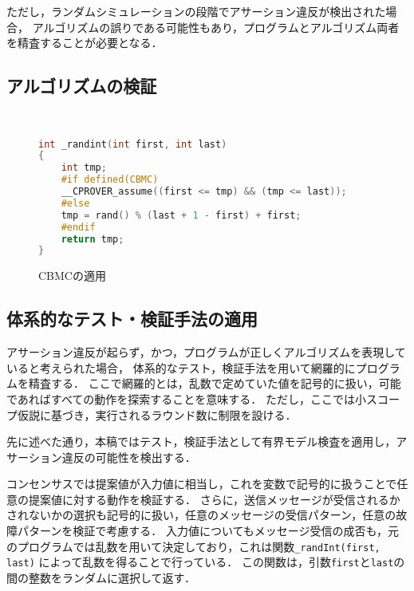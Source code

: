 \documentclass[technicalreport]{ieicej}
\theoremstyle{plain}
\begin{document}
ただし，ランダムシミュレーションの段階でアサーション違反が検出された場合，
アルゴリズムの誤りである可能性もあり，プログラムとアルゴリズム両者を精査することが必要となる．

\subsection{アルゴリズムの検証}\label{sec:cmbc}
\begin{figure}[t]
    \centering　{\scriptsize
\begin{lstlisting}[language=c]
int _randint(int first, int last)
{
    int tmp;
    #if defined(CBMC)
    __CPROVER_assume((first <= tmp) && (tmp <= last));
    #else
    tmp = rand() % (last + 1 - first) + first;
    #endif
    return tmp;
}
\end{lstlisting}}

        \caption{CBMCの適用}\label{fig:cbmc}
    \end{figure}          
 

\subsection{体系的なテスト・検証手法の適用}

アサーション違反が起らず，かつ，プログラムが正しくアルゴリズムを表現していると考えられた場合，
体系的なテスト，検証手法を用いて網羅的にプログラムを精査する．
ここで網羅的とは，乱数で定めていた値を記号的に扱い，可能であればすべての動作を探索することを意味する．
ただし，ここでは小スコープ仮説に基づき，実行されるラウンド数に制限を設ける．

先に述べた通り，本稿ではテスト，検証手法として有界モデル検査を適用し，アサーション違反の可能性を検出する．


コンセンサスでは提案値が入力値に相当し，これを変数で記号的に扱うことで任意の提案値に対する動作を検証する．
さらに，送信メッセージが受信されるかされないかの選択も記号的に扱い，任意のメッセージの受信パターン，任意の故障パターンを検証で考慮する．
入力値についてもメッセージ受信の成否も，元のプログラムでは乱数を用いて決定しており，これは関数\verb|_randInt(first, last)|
によって乱数を得ることで行っている．
この関数は，引数\verb|first|と\verb|last|の間の整数をランダムに選択して返す．
\end{document}
